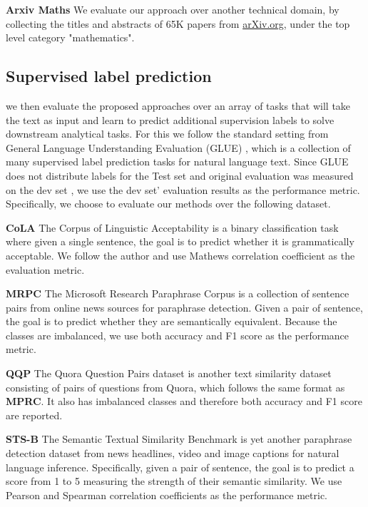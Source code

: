 \noindent \textbf{Arxiv Maths} 
We evaluate our approach over another 
technical domain, by collecting the titles and abstracts of 65K papers  from \url{arXiv.org}, under the top level category "mathematics". 

\subsection{Supervised label prediction}
we then evaluate the proposed approaches over an array of tasks that will take the text as input and learn to predict additional supervision labels to solve downstream analytical tasks. 
For this we follow the standard setting from 
General Language Understanding Evaluation (GLUE) \cite{wang2018glue}, which is a collection of many supervised label prediction tasks for natural language text.
Since GLUE does not distribute labels for the Test set and original evaluation was measured on the dev set \cite{devlin2018bert}, we use the dev set' evaluation results as the performance metric.
Specifically, we choose to evaluate our methods over the following dataset.

\noindent \textbf{CoLA} The Corpus of Linguistic Acceptability is a binary classification task where given a single sentence, the goal is to predict whether it is grammatically acceptable. We follow the author \cite{wang2018glue} and use Mathews correlation coefficient as the evaluation metric.

\noindent \textbf{MRPC} The Microsoft Research Paraphrase Corpus is a collection of sentence pairs from online news sources for paraphrase detection. Given a pair of sentence, the goal is to predict whether they are semantically equivalent. 
Because the classes are imbalanced, we use both accuracy and F1 score as the performance metric.


\noindent \textbf{QQP} The Quora Question Pairs dataset is another text similarity dataset consisting of pairs of questions from Quora, which follows the same format as \textbf{MPRC}. It also has imbalanced classes and therefore both accuracy and F1 score are reported.


\noindent \textbf{STS-B} 
The Semantic Textual Similarity Benchmark is yet another paraphrase detection dataset from news headlines,  video and image captions for natural language inference. Specifically, given a pair of sentence, the goal is to predict a score from 1 to 5 measuring the strength of their semantic similarity. We use Pearson and Spearman correlation coefficients as the performance metric.


